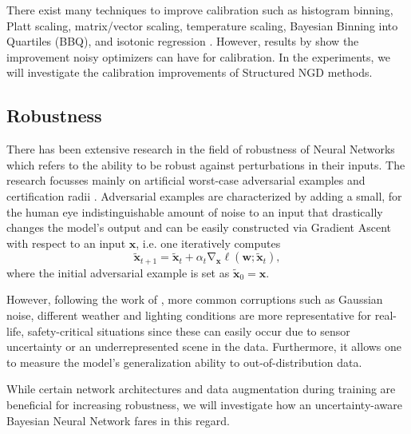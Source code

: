 \documentclass[a4paper, 11pt, oneside]{scrartcl}
\theoremstyle{break}
\DeclareMathOperator{\grad}{\nabla}
\newcommand{\matr}[1]{\boldsymbol{#1}}
\numberwithin{equation}{section}
\begin{document}
			There exist many techniques to improve calibration such as histogram binning, Platt scaling, matrix/vector scaling, temperature scaling, Bayesian Binning into Quartiles (BBQ), and isotonic regression \parencite{GPS17}.
			However, results by \parencite{ZSD+17} show the improvement noisy optimizers can have for calibration.
			In the experiments, we will investigate the calibration improvements of Structured NGD methods.

		\subsection{Robustness}
			There has been extensive research in the field of robustness of Neural Networks which refers to the ability to be robust against perturbations in their inputs.
			The research focusses mainly on artificial worst-case adversarial examples and certification radii \parencite{CRK19, GSS14}.
			Adversarial examples are characterized by adding a small, for the human eye indistinguishable amount of noise to an input that drastically changes the model's output and can be easily constructed via Gradient Ascent with respect to an input $\matr{x}$, i.e. one iteratively computes
			\begin{equation*}
				\matr{\tilde{x}}_{t+1} = \matr{\tilde{x}}_t + \alpha_t \grad_{\matr{x}} \ell(\matr{w}; \matr{\tilde{x}}_t),
			\end{equation*}
			where the initial adversarial example is set as $\matr{\tilde{x}}_0 = \matr{x}$.

			However, following the work of \parencite{HD19, HBM21}, more common corruptions such as Gaussian noise, different weather and lighting conditions are more representative for real-life, safety-critical situations since these can easily occur due to sensor uncertainty or an underrepresented scene in the data.
			Furthermore, it allows one to measure the model's generalization ability to out-of-distribution data. 

			While certain network architectures and data augmentation during training are beneficial for increasing robustness, we will investigate how an uncertainty-aware Bayesian Neural Network fares in this regard.
\end{document}
